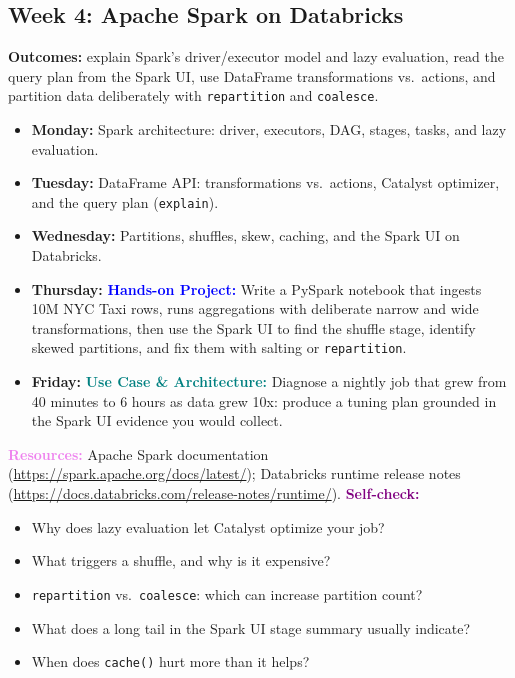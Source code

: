 \documentclass[11pt, a4paper]{article}
\newcommand{\project}[1]{\vspace{1mm}\noindent\textbf{\textcolor{blue}{Hands-on Project:}} #1}
\newcommand{\usecase}[1]{\vspace{1mm}\noindent\textbf{\textcolor{teal}{Use Case \& Architecture:}} #1}
\newcommand{\dayitem}[2]{\item \textbf{#1:} #2}
\newcommand{\resources}[1]{\vspace{1mm}\noindent\textbf{\textcolor{violet}{Resources:}} #1}
\newcommand{\selfcheck}[1]{\vspace{1mm}\noindent\textbf{\textcolor{purple}{Self-check:}} #1}
\begin{document}
\subsection*{Week 4: Apache Spark on Databricks}
\par\noindent\textbf{Outcomes:} explain Spark's driver/executor model and lazy evaluation, read the query plan from the Spark UI, use DataFrame transformations vs.\ actions, and partition data deliberately with \texttt{repartition} and \texttt{coalesce}.
\begin{itemize}[label=-]
    \dayitem{Monday}{Spark architecture: driver, executors, DAG, stages, tasks, and lazy evaluation.}
    \dayitem{Tuesday}{DataFrame API: transformations vs.\ actions, Catalyst optimizer, and the query plan (\texttt{explain}).}
    \dayitem{Wednesday}{Partitions, shuffles, skew, caching, and the Spark UI on Databricks.}
    \dayitem{Thursday}{\project{Write a PySpark notebook that ingests 10M NYC Taxi rows, runs aggregations with deliberate narrow and wide transformations, then use the Spark UI to find the shuffle stage, identify skewed partitions, and fix them with salting or \texttt{repartition}.}}
    \dayitem{Friday}{\usecase{Diagnose a nightly job that grew from 40 minutes to 6 hours as data grew 10x: produce a tuning plan grounded in the Spark UI evidence you would collect.}}
\end{itemize}
\resources{Apache Spark documentation (\url{https://spark.apache.org/docs/latest/}); Databricks runtime release notes (\url{https://docs.databricks.com/release-notes/runtime/}).}
\selfcheck{\begin{itemize}[label=-, leftmargin=1.5em, itemsep=0pt]
    \item Why does lazy evaluation let Catalyst optimize your job?
    \item What triggers a shuffle, and why is it expensive?
    \item \texttt{repartition} vs.\ \texttt{coalesce}: which can increase partition count?
    \item What does a long tail in the Spark UI stage summary usually indicate?
    \item When does \texttt{cache()} hurt more than it helps?
\end{itemize}}
\end{document}
